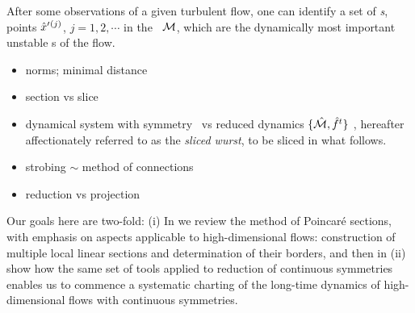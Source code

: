 After some observations of a given turbulent flow, one can identify a set
of \emph{\template s}, {points}
${\hat{x}'}{}^{(j)}$, $j=1,2,\cdots$ in the \statesp\ ${\cal M}$, which are the
dynamically most important unstable {\recurrStr s} of the flow.


\begin{itemize}

    \ifdraft\color{blue}
  \item
        norms; minimal distance
  \item section {\PoincS} vs slice \pSRed

  \item
dynamical system  with symmetry \Group\ vs reduced dynamics
$\{\hat{\cal M},\hat{f}^t\}$ , hereafter affectionately referred to as the {\em
sliced wurst}, to be sliced in what follows.
  \item strobing $\sim$ method of connections
  \item reduction vs projection
    \color{black}\fi
\end{itemize}

Our goals here are two-fold:
(i) In  we review the method of Poincar\'e sections, with
    emphasis on aspects applicable to high-dimensional flows: construction of
    multiple local linear sections and determination of their borders, and then in
(ii)  show how the same set of tools applied to
    reduction of continuous symmetries enables us to commence a
    systematic charting of the long-time dynamics of high-dimensional
    flows with continuous symmetries.
